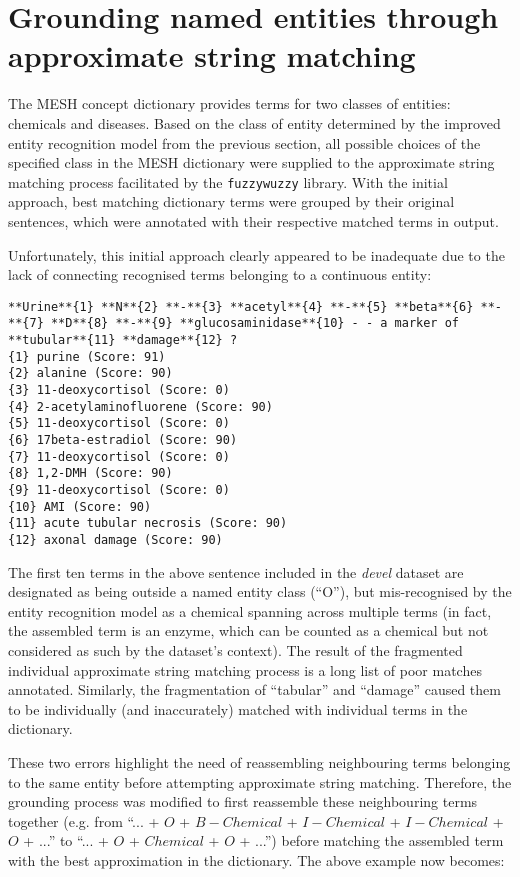 \documentclass[10pt, oneside]{article}
\begin{document}
\section{Grounding named entities through approximate string matching}

The MESH concept dictionary provides terms for two classes of entities: chemicals and diseases. Based on the class of entity determined by the improved entity recognition model from the previous section, all possible choices of the specified class in the MESH dictionary were supplied to the approximate string matching process facilitated by the \verb|fuzzywuzzy| \cite{fuzzywuzzy} library. With the initial approach, best matching dictionary terms were grouped by their original sentences, which were annotated with their respective matched terms in output.

Unfortunately, this initial approach clearly appeared to be inadequate due to the lack of connecting recognised terms belonging to a continuous entity:

\begin{lstlisting}[breaklines]
**Urine**{1} **N**{2} **-**{3} **acetyl**{4} **-**{5} **beta**{6} **-**{7} **D**{8} **-**{9} **glucosaminidase**{10} - - a marker of **tubular**{11} **damage**{12} ?
{1} purine (Score: 91)
{2} alanine (Score: 90)
{3} 11-deoxycortisol (Score: 0)
{4} 2-acetylaminofluorene (Score: 90)
{5} 11-deoxycortisol (Score: 0)
{6} 17beta-estradiol (Score: 90)
{7} 11-deoxycortisol (Score: 0)
{8} 1,2-DMH (Score: 90)
{9} 11-deoxycortisol (Score: 0)
{10} AMI (Score: 90)
{11} acute tubular necrosis (Score: 90)
{12} axonal damage (Score: 90)
\end{lstlisting}

The first ten terms in the above sentence included in the \emph{devel} dataset are designated as being outside a named entity class (``O''), but mis-recognised by the entity recognition model as a chemical spanning across multiple terms (in fact, the assembled term is an enzyme, which can be counted as a chemical but not considered as such by the dataset's context). The result of the fragmented individual approximate string matching process is a long list of poor matches annotated. Similarly, the fragmentation of ``tabular'' and ``damage'' caused them to be individually (and inaccurately) matched with individual terms in the dictionary.

These two errors highlight the need of reassembling neighbouring terms belonging to the same entity before attempting approximate string matching. Therefore, the grounding process was modified to first reassemble these neighbouring terms together (e.g. from ``... + $O$ + $B-Chemical$ + $I-Chemical$ + $I-Chemical$ +  $O$ + ...'' to ``... + $O$ + $Chemical$ +  $O$ + ...'') before matching the assembled term with the best approximation in the dictionary. The above example now becomes:
\end{document}
